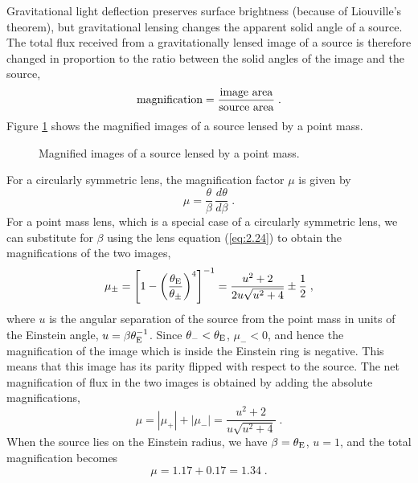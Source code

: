 \documentclass[a4paper,10pt]{article} %
\begin{document}
Gravitational light deflection preserves surface brightness (because
of Liouville's theorem), but gravitational lensing changes the
apparent solid angle of a source. The total flux received from a
gravitationally lensed image of a source is therefore changed in
proportion to the ratio between the solid angles of the image and the
source,
\begin{equation}
  \hbox{magnification} =
  \frac{\hbox{image area}}{\hbox{source area}}\;.
\label{eq:2.26}
\end{equation}
Figure \ref{NB:fig2.7} shows the magnified images of a source lensed
by a point mass.

\begin{figure}[ht] %
\begin{center}
\begin{minipage}[t]{0.6\hsize}
\end{minipage}
\end{center}
\caption{Magnified images of a source lensed by a point mass.}
\label{NB:fig2.7}
\end{figure}

For a circularly symmetric lens, the magnification factor $\mu$ is
given by
\begin{equation}
  \mu = \frac{\theta}{\beta}\,\frac{d\theta}{d\beta}\;.
\label{eq:2.27}
\end{equation}
For a point mass lens, which is a special case of a circularly
symmetric lens, we can substitute for $\beta$ using the lens equation
(\ref{eq:2.24}) to obtain the magnifications of the two images,
\begin{equation}
  \mu_\pm = \left[
    1-\left(\frac{\theta_{\rm E}}{\theta_\pm}\right)^4
  \right]^{-1} =
  \frac{u^2+2}{2u\sqrt{u^2+4}}\pm\frac{1}{2}\;,
\label{eq:2.28}
\end{equation}
where $u$ is the angular separation of the source from the point mass
in units of the Einstein angle, $u=\beta\theta_{\rm E}^{-1}$. Since
$\theta_-<\theta_{\rm E}$, $\mu_-<0$, and hence the magnification of
the image which is inside the Einstein ring is negative. This means
that this image has its parity flipped with respect to the source.
The net magnification of flux in the two images is obtained by adding
the absolute magnifications,
\begin{equation}
  \mu = |\mu_+|+|\mu_-| = \frac{u^2+2}{u\sqrt{u^2+4}}\;.
\label{eq:2.29}
\end{equation}
When the source lies on the Einstein radius, we have
$\beta=\theta_{\rm E}$, $u=1$, and the total magnification becomes
\begin{equation}
  \mu = 1.17 + 0.17 = 1.34\;.
\label{eq:2.30}
\end{equation}
\end{document}
